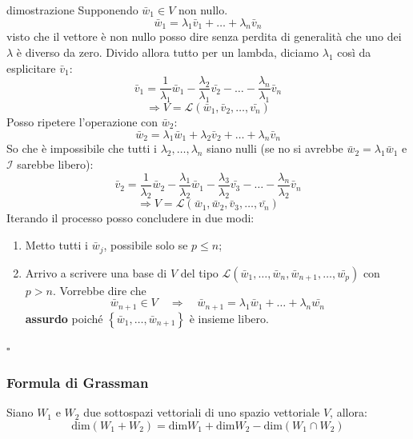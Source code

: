 \documentclass[x11names]{article}
\newcommand*{\QEDB}{\null\nobreak\hfill\ensuremath{\square}}%
\begin{document}
\begin{es}{dimostrazione}
	Supponendo $\bar{w}_{1} \in V$ non nullo.
	\[
	\bar{w}_{1}  = \lambda_1 \bar{v}_{1} + \dots + \lambda_n \bar{v}_{n}
	\]
	visto che il vettore è non nullo posso dire senza perdita di generalità che uno dei $\lambda$ è diverso da zero. Divido allora tutto per un lambda, diciamo $\lambda_1$ così da esplicitare $\bar{v}_{1}$:
	\[
	\bar{v}_{1} = \frac{1}{\lambda_1}\bar{w}_{1} - \frac{\lambda_{2}}{\lambda_{1}}\bar{v_{2}} - \dots - \frac{\lambda_{n}}{\lambda_{1}}\bar{v}_{n}
	\] 
	\[
	\Longrightarrow V = \mathcal{L}\left(\bar{w}_{1},\bar{v}_{2},\dots,\bar{v_{n}}\right)
	\]
	Posso ripetere l'operazione con $\bar{w}_{2}$:
	\[
	\bar{w}_{2} = \lambda_{1}\bar{w}_{1} + \lambda_2\bar{v}_{2} + \dots + \lambda_n \bar{v}_{n}
	\]
	So che è impossibile che tutti i $\lambda_{2}, \dots , \lambda_{n}$ siano nulli (se no si avrebbe $\bar{w}_{2} = \lambda_{1} \bar{w}_{1}$ e $\mathcal{I}$ sarebbe libero):
	\[
	\bar{v}_{2} = \frac{1}{\lambda_2}\bar{w}_{2} - \frac{\lambda_{1}}{\lambda_2}\bar{w}_{1} - \frac{\lambda_{3}}{\lambda_{2}}\bar{v_{3}} - \dots - \frac{\lambda_{n}}{\lambda_{2}}\bar{v}_{n}
	\]
	\[
	\Longrightarrow V =  \mathcal{L}\left(\bar{w}_{1},\bar{w}_{2},\bar{v}_{3},\dots,\bar{v_{n}}\right)
	\]
	Iterando il processo posso concludere in due modi:
	\begin{enumerate}
		\item Metto tutti i $\bar{w}_{j}$, possibile solo se $p \leq n$;
		\item Arrivo a scrivere una base di $V$ del tipo $\mathcal{L}\left(\bar{w}_{1},\dots,\bar{w}_{n},\bar{w}_{n+1},\dots,\bar{w_{p}}\right)$ con $p > n$. Vorrebbe dire che
		\[
		\bar{w}_{n+1} \in V \quad \Longrightarrow \quad \bar{w}_{n+1}  = \lambda_{1}\bar{w}_{1} + \dots + \lambda_{n}\bar{w_{n}}
		\]
		\textbf{assurdo} poiché $\left\{\bar{w}_{1},\dots,\bar{w}_{n+1}\right\}$ è insieme libero.
	\end{enumerate} \QEDB
\end{es}


				\subsubsection{Formula di Grassman}
				Siano $W_{1}$ e $W_{2}$ due sottospazi vettoriali di uno spazio vettoriale $V$, allora:
				\[
				\text{dim}\left(W_{1} + W_{2}\right) = \text{dim}W_{1} + \text{dim}W_{2} - \text{dim}\left(W_{1} \cap W_{2}\right)
				\]
\end{document}
